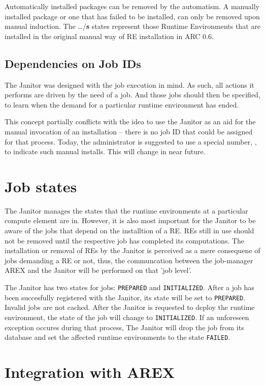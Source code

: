 Automatically installed packages can be removed by the automatism. A
manually installed package or one that has failed to be installed,
can only be removed upon manual induction.  The \ldots/{\bf s} states
represent those Runtime Environments that are installed in the original
manual way of RE installation in ARC 0.6.

\subsection{Dependencies on Job IDs}

The Janitor was designed with the job execution in mind. As such, all
actions it performs are driven by the need of a job. And those jobs
should then be specified, to learn when the demand for a particular
runtime environment has ended.

This concept partially conflicts with the idea to use the Janitor
as an aid for the manual invocation of an installation -- there is no
job ID that could be assigned for that process. Today, the administrator
is suggested to use a special number, , to indicate such manual
installs. This will change in near future.

\section{Job states}

The Janitor manages the states that the runtime environments at a particular
compute element are in. However, it is also most important for the Janitor
to be aware of the jobs that depend on the installtion of a RE. REs still in use
should not be removed until the respective job has completed its computations.
The installation or removal of REs by the Janitor is perceived as a mere
consequene of jobs demanding a RE or not, thus, the communcation between
the job-manager AREX and the Janitor will be performed on that 'job level'.

The Janitor has two states for jobs: \texttt{PREPARED} and
\texttt{INITIALIZED}. After a job has been succesfully registered with
the Janitor, its state will be set to \texttt{PREPARED}. Invalid jobs
are not cached.  After the Janitor is requested to deploy the runtime
environment, the state of the job will change to \texttt{INITIALIZED}. If
an unforeseen exception occures during that process, The Janitor will drop
the job from its database and set the affected runtime environments to
the state \texttt{FAILED}.

\section{Integration with AREX}


